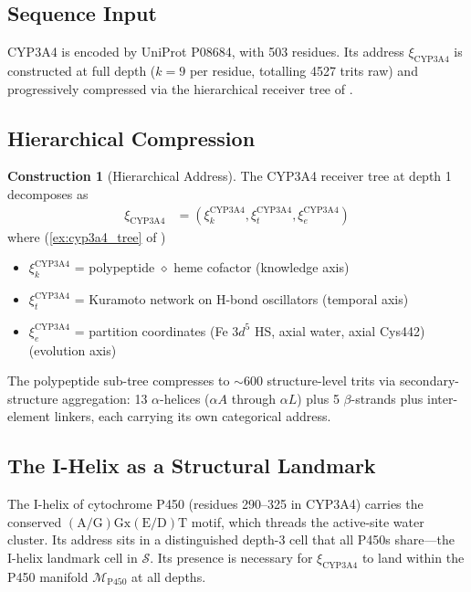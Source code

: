 \documentclass[11pt,twocolumn,a4paper]{article}
\theoremstyle{definition}
\newtheorem{construction}[theorem]{Construction}
\theoremstyle{remark}
\newcommand{\Sspace}{\mathcal{S}}
\newcommand{\Sexp}{\xi}
\begin{document}
\subsection{Sequence Input}

CYP3A4 is encoded by UniProt P08684, with 503 residues. Its address $\Sexp_{\mathrm{CYP3A4}}$ is constructed at full depth ($k = 9$ per residue, totalling 4527 trits raw) and progressively compressed via the hierarchical receiver tree of \citep{sachikonye2025_paper1}.

\subsection{Hierarchical Compression}

\begin{construction}[Hierarchical Address]
\label{cons:hierarchical}
The CYP3A4 receiver tree at depth 1 decomposes as
\begin{align}
\Sexp_{\mathrm{CYP3A4}} &= (\Sexp_k^{\mathrm{CYP3A4}}, \Sexp_t^{\mathrm{CYP3A4}}, \Sexp_e^{\mathrm{CYP3A4}})
\end{align}
where (\cref{ex:cyp3a4_tree} of \citep{sachikonye2025_paper1})
\begin{itemize}[nosep, leftmargin=*]
\item $\Sexp_k^{\mathrm{CYP3A4}}$ = polypeptide $\diamond$ heme cofactor (knowledge axis)
\item $\Sexp_t^{\mathrm{CYP3A4}}$ = Kuramoto network on H-bond oscillators (temporal axis)
\item $\Sexp_e^{\mathrm{CYP3A4}}$ = partition coordinates (Fe $3d^5$ HS, axial water, axial Cys442) (evolution axis)
\end{itemize}
The polypeptide sub-tree compresses to $\sim 600$ structure-level trits via secondary-structure aggregation: 13 $\alpha$-helices ($\alpha A$ through $\alpha L$) plus 5 $\beta$-strands plus inter-element linkers, each carrying its own categorical address.
\end{construction}

\subsection{The I-Helix as a Structural Landmark}

The I-helix of cytochrome P450 (residues 290--325 in CYP3A4) carries the conserved $\mathrm{(A/G)Gx(E/D)T}$ motif, which threads the active-site water cluster. Its address sits in a distinguished depth-3 cell that all P450s share---the I-helix landmark cell in $\Sspace$. Its presence is necessary for $\Sexp_{\mathrm{CYP3A4}}$ to land within the P450 manifold $\mathcal{M}_{\mathrm{P450}}$ at all depths.
\end{document}
